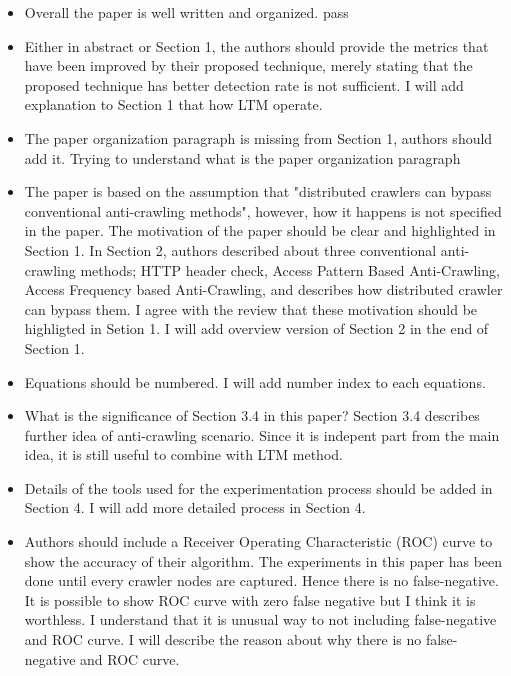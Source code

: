 \documentclass[sigconf,anonymous=true]{acmart}
\begin{document}
\begin{itemize}
\item Overall the paper is well written and organized.
\subitem pass

\item Either in abstract or Section 1, the authors should provide the metrics that have been improved by their proposed technique, merely stating that the proposed technique has better detection rate is not sufficient.
\subitem I will add explanation to Section 1 that how LTM operate. 

\item The paper organization paragraph is missing from Section 1, authors should add it.
\subitem Trying to understand what is the paper organization paragraph

\item The paper is based on the assumption that "distributed crawlers can bypass conventional anti-crawling methods", however, how it happens is not specified in the paper. The motivation of the paper should be clear and highlighted in Section 1.
\subitem In Section 2, authors described about three conventional anti-crawling methods; HTTP header check, Access Pattern Based Anti-Crawling, Access Frequency based Anti-Crawling, and describes how distributed crawler can bypass them. 
\subitem I agree with the review that these motivation should be highligted in Setion 1. I will add overview version of Section 2 in the end of Section 1.

\item Equations should be numbered.
\subitem I will add number index to each equations.

\item What is the significance of Section 3.4 in this paper?
\subitem Section 3.4 describes further idea of anti-crawling scenario. Since it is indepent part from the main idea, it is still useful to combine with LTM method.

\item Details of the tools used for the experimentation process should be added in Section 4.
\subitem I will add more detailed process in Section 4.

\item Authors should include a Receiver Operating Characteristic (ROC) curve to show the accuracy of their algorithm.
\subitem The experiments in this paper has been done until every crawler nodes are captured. Hence there is no false-negative.
\subitem It is possible to show ROC curve with zero false negative but I think it is worthless.
\subitem I understand that it is unusual way to not including false-negative and ROC curve. I will describe the reason about why there is no false-negative and ROC curve.
\end{itemize}
\end{document}
